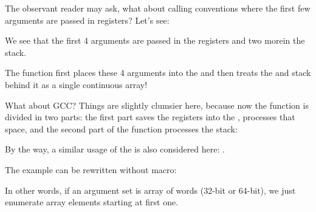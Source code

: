 \label{variadic_arith_registers}

The observant reader may ask, what about calling conventions where the first few arguments are passed in registers?
Let's see:



We see that the first 4 arguments are passed in the registers and two more\EMDASH{}in the stack.

The  function first places these 4 arguments into the  and then treats
the  and stack behind it as a single continuous array!

What about GCC? Things are slightly clumsier here, because now the function is divided in two parts:
the first part saves the registers into the , processes that space, and the second part of the function processes 
the stack:



By the way, a similar usage of the  is also considered here: .


The example can be rewritten without  macro:



In other words, if an argument set is array of words (32-bit or 64-bit), we just enumerate array elements starting
at first one.

